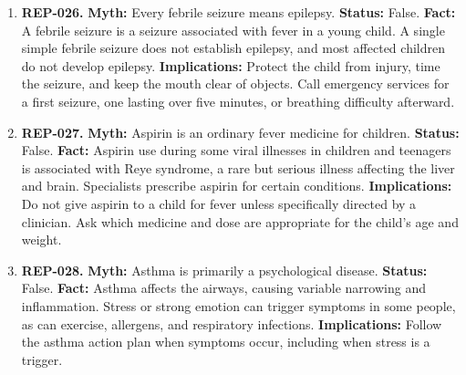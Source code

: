 \documentclass[11pt,oneside]{book}
\begin{document}
\begin{enumerate}[leftmargin=0pt,labelwidth=0pt,labelsep=0pt,itemindent=0pt]
\textbf{Status:} False.\newline
\textbf{Fact:} Most fevers from infection resolve without brain injury. The underlying illness can still be serious. Heatstroke is a different condition in which uncontrolled overheating can damage organs. \cite{ref8,ref295}\newline
\textbf{Implications:} Consider age, alertness, breathing, and fluid intake. An infant under three months with a rectal temperature of 38 degrees Celsius or higher needs prompt assessment.
\item[] \textbf{REP-026.} \textbf{Myth:} Every febrile seizure means epilepsy.\newline
\textbf{Status:} False.\newline
\textbf{Fact:} A febrile seizure is a seizure associated with fever in a young child. A single simple febrile seizure does not establish epilepsy, and most affected children do not develop epilepsy. \cite{ref333,ref302}\newline
\textbf{Implications:} Protect the child from injury, time the seizure, and keep the mouth clear of objects. Call emergency services for a first seizure, one lasting over five minutes, or breathing difficulty afterward.
\item[] \textbf{REP-027.} \textbf{Myth:} Aspirin is an ordinary fever medicine for children.\newline
\textbf{Status:} False.\newline
\textbf{Fact:} Aspirin use during some viral illnesses in children and teenagers is associated with Reye syndrome, a rare but serious illness affecting the liver and brain. Specialists prescribe aspirin for certain conditions. \cite{ref334}\newline
\textbf{Implications:} Do not give aspirin to a child for fever unless specifically directed by a clinician. Ask which medicine and dose are appropriate for the child's age and weight.
\item[] \textbf{REP-028.} \textbf{Myth:} Asthma is primarily a psychological disease.\newline
\textbf{Status:} False.\newline
\textbf{Fact:} Asthma affects the airways, causing variable narrowing and inflammation. Stress or strong emotion can trigger symptoms in some people, as can exercise, allergens, and respiratory infections. \cite{ref179}\newline
\textbf{Implications:} Follow the asthma action plan when symptoms occur, including when stress is a trigger.

\end{enumerate}
\end{document}
